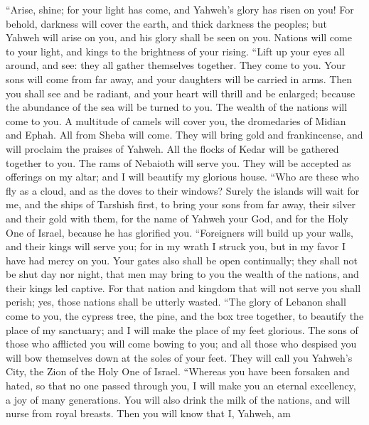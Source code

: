 ``Arise, shine; for your light has come, and Yahweh's glory
has risen on you!  For behold, darkness will cover the
earth, and thick darkness the peoples; but Yahweh will arise on you, and
his glory shall be seen on you.  Nations will come to your
light, and kings to the brightness of your rising.  ``Lift
up your eyes all around, and see: they all gather themselves together.
They come to you. Your sons will come from far away, and your daughters
will be carried in arms.  Then you shall see and be radiant,
and your heart will thrill and be enlarged; because the abundance of the
sea will be turned to you. The wealth of the nations will come to you.
 A multitude of camels will cover you, the dromedaries of
Midian and Ephah. All from Sheba will come. They will bring gold and
frankincense, and will proclaim the praises of Yahweh.  All
the flocks of Kedar will be gathered together to you. The rams of
Nebaioth will serve you. They will be accepted as offerings on my altar;
and I will beautify my glorious house.  ``Who are these who
fly as a cloud, and as the doves to their windows?  Surely
the islands will wait for me, and the ships of Tarshish first, to bring
your sons from far away, their silver and their gold with them, for the
name of Yahweh your God, and for the Holy One of Israel, because he has
glorified you.  ``Foreigners will build up your walls, and
their kings will serve you; for in my wrath I struck you, but in my
favor I have had mercy on you.  Your gates also shall be
open continually; they shall not be shut day nor night, that men may
bring to you the wealth of the nations, and their kings led captive.
 For that nation and kingdom that will not serve you shall
perish; yes, those nations shall be utterly wasted.  ``The
glory of Lebanon shall come to you, the cypress tree, the pine, and the
box tree together, to beautify the place of my sanctuary; and I will
make the place of my feet glorious.  The sons of those who
afflicted you will come bowing to you; and all those who despised you
will bow themselves down at the soles of your feet. They will call you
Yahweh's City, the Zion of the Holy One of Israel. 
``Whereas you have been forsaken and hated, so that no one passed
through you, I will make you an eternal excellency, a joy of many
generations.  You will also drink the milk of the nations,
and will nurse from royal breasts. Then you will know that I, Yahweh, am
